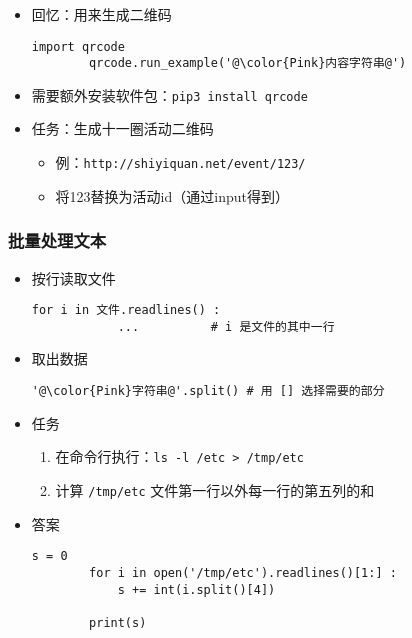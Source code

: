 \begin{frame} [fragile]
	\frametitle{}
	\linespread{1.5}
	\begin{itemize}
	\item 回忆：用来生成二维码
		\begin{lstlisting}[style=pythonstyle, gobble=8, texcl, escapechar=@]
		import qrcode
		qrcode.run_example('@\color{Pink}内容字符串@')
		\end{lstlisting}
	\item 需要额外安装软件包：\texttt{pip3 install qrcode}
	\item 任务：生成十一圈活动二维码
		\begin{itemize}
		\item 例：\texttt{http://shiyiquan.net/event/123/}
		\item 将123替换为活动id（通过input得到）
		\end{itemize}
	\end{itemize}
\end{frame}

\begin{frame} [fragile]
	\frametitle{批量处理文本}
	\linespread{1.25}
	\begin{itemize}
	\item 按行读取文件
		\begin{lstlisting}[style=pythonstyle, gobble=8, texcl]
		for i in 文件.readlines() :
			...			 # i 是文件的其中一行
		\end{lstlisting}
	\item 取出数据
		\begin{lstlisting}[style=pythonstyle, gobble=8, texcl, escapechar=@]
		'@\color{Pink}字符串@'.split()	# 用 [] 选择需要的部分
		\end{lstlisting}
	\item 任务
		\begin{enumerate}
		\item 在命令行执行：\texttt{ls -l /etc > /tmp/etc}
		\item 计算 \texttt{/tmp/etc} 文件第一行以外每一行的第五列的和
		\end{enumerate}
	\item 答案
		\fontsize{2}{2}\selectfont
		\begin{lstlisting}[style=pythonstyle, gobble=8, texcl]
		s = 0
		for i in open('/tmp/etc').readlines()[1:] :
			s += int(i.split()[4])

		print(s)
		\end{lstlisting}
	\end{itemize}
\end{frame}

